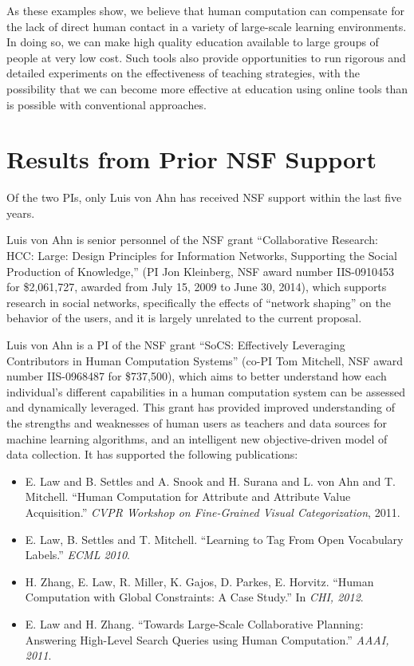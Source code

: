 \documentclass[12pt]{article}
\begin{document}
As these examples show, we believe that human computation can
compensate for the lack of direct human contact in a variety of
large-scale learning environments.  In doing so, we can make high
quality education available to large groups of people at very low
cost.  Such tools also provide opportunities to run rigorous and
detailed experiments on the effectiveness of teaching strategies, with
the possibility that we can become more effective at education using
online tools than is possible with conventional approaches.

\section{Results from Prior NSF Support}

Of the two PIs, only Luis von Ahn has received NSF support within the
last five years. 

Luis von Ahn is senior personnel of the NSF grant ``Collaborative 
Research: HCC: Large: Design Principles for Information Networks, 
Supporting the Social Production of Knowledge,'' (PI Jon Kleinberg, 
NSF award number IIS-0910453 for \$2,061,727, awarded from July 15, 
2009 to June 30, 2014), which supports research in social networks, 
specifically the effects of ``network shaping'' on the behavior of the 
users, and it is largely unrelated to the current proposal.

Luis von Ahn is a PI of the NSF grant ``SoCS: Effectively Leveraging 
Contributors in Human Computation Systems'' (co-PI Tom Mitchell, NSF 
award number IIS-0968487 for \$737,500), which aims to better 
understand how each individual's different capabilities in a human 
computation system can be assessed and dynamically leveraged. This 
grant has provided improved understanding of the strengths and weaknesses 
of human users as teachers and data sources for machine learning 
algorithms, and an intelligent new objective-driven model of data 
collection. It has supported the following publications:

\begin{itemize}

\item E. Law and B. Settles and A. Snook and H. Surana and L. von 
Ahn and T. Mitchell.  ``Human Computation for Attribute and 
Attribute Value Acquisition.'' {\em CVPR Workshop on Fine-Grained 
Visual Categorization}, 2011.

\item E. Law, B. Settles and T. Mitchell.  ``Learning to Tag From Open 
Vocabulary Labels.'' {\em ECML 2010}.

\item H. Zhang, E. Law, R. Miller, K. Gajos, D. Parkes, E. Horvitz.  
``Human Computation with Global Constraints: A Case Study.''  In 
{\em CHI, 2012}.

\item E. Law and H. Zhang. ``Towards Large-Scale Collaborative 
Planning: Answering High-Level Search Queries using Human 
Computation.'' {\em AAAI, 2011}.
\end{itemize}
\end{document}
